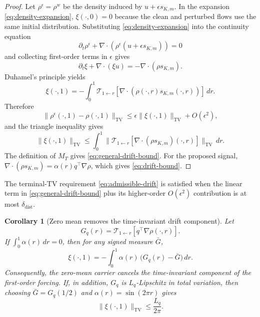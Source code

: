\documentclass[11pt]{article}
\newtheorem{corollary}{Corollary}
\newcommand{\TV}{\mathrm{TV}}
\begin{document}
\begin{proof}
Let $\rho^\epsilon=\rho^w$ be the density induced by
$u+\epsilon s_{K,m}$. In the expansion
\eqref{eq:density-expansion}, $\xi(\cdot,0)=0$ because the clean and
perturbed flows use the same initial distribution. Substituting
\eqref{eq:density-expansion} into the
continuity equation
\begin{equation}
\partial_t\rho^\epsilon
+\nabla\!\cdot\!\left(\rho^\epsilon(u+\epsilon s_{K,m})\right)=0
\end{equation}
and collecting first-order terms in $\epsilon$ gives
\begin{equation}
\partial_t\xi+\nabla\!\cdot(\xi u)
=
-\nabla\!\cdot(\rho s_{K,m}).
\label{eq:linearized-continuity}
\end{equation}
Duhamel's principle yields
\begin{equation}
\xi(\cdot,1)
=
-\int_0^1
\mathcal{T}_{1\leftarrow r}\!\left[
\nabla\!\cdot(\rho(\cdot,r)s_{K,m}(\cdot,r))
\right]\,dr .
\end{equation}
Therefore
\begin{equation}
\|\rho^\epsilon(\cdot,1)-\rho(\cdot,1)\|_{\TV}
\le
\epsilon\|\xi(\cdot,1)\|_{\TV}+O(\epsilon^2),
\end{equation}
and the triangle inequality gives
\begin{equation}
\|\xi(\cdot,1)\|_{\TV}
\le
\int_0^1
\bigl\|\mathcal{T}_{1\leftarrow r}[\nabla\!\cdot(\rho s_{K,m})(\cdot,r)]\bigr\|_{\TV}\,dr .
\end{equation}
The definition of $M_T$ gives \eqref{eq:general-drift-bound}. For the
proposed signal, $\nabla\!\cdot(\rho s_{K,m})=\alpha(r)q^\top\nabla\rho$,
which gives \eqref{eq:drift-bound}.
\end{proof}

The terminal-TV requirement \eqref{eq:admissible-drift} is satisfied
when the linear term in \eqref{eq:general-drift-bound} plus its
higher-order $O(\epsilon^2)$ contribution is at most
$\delta_{\mathrm{dist}}$.

\begin{corollary}[Zero mean removes the time-invariant drift component]
\label{cor:zero-mean-gap}
Let
\[
G_q(r)=
\mathcal{T}_{1\leftarrow r}\!\left[
q^\top\nabla\rho(\cdot,r)
\right].
\]
If $\int_0^1\alpha(r)\,dr=0$, then for any signed measure $\bar G$,
\begin{equation}
\xi(\cdot,1)
=
-\int_0^1 \alpha(r)\,\bigl(G_q(r)-\bar G\bigr)\,dr .
\label{eq:zero-mean-residual}
\end{equation}
Consequently, the zero-mean carrier cancels the time-invariant component
of the first-order forcing. If, in addition, $G_q$ is $L_q$-Lipschitz in
total variation, then choosing $\bar G=G_q(1/2)$ and
$\alpha(r)=\sin(2\pi r)$ gives
\begin{equation}
\|\xi(\cdot,1)\|_{\TV}
\le
\frac{L_q}{2\pi}.
\label{eq:zero-mean-lipschitz}
\end{equation}
\end{corollary}
\end{document}
